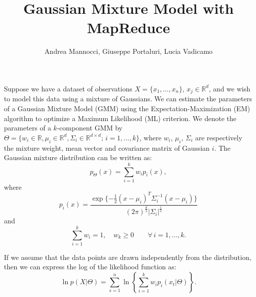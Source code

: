 \documentclass[a4paper,10pt]{article}
\title{Gaussian Mixture Model with MapReduce}%
\author{Andrea Mannocci, Giuseppe Portaluri, Lucia Vadicamo}
\date{}
\begin{document}
\maketitle
Suppose we have a dataset of observations $X=\{x_1, \dots, x_n\}$, $x_j\in \mathbb{R}^d$, and we wish to model this data using a mixture of Gaussians. We can estimate the parameters of a Gaussian Mixture Model (GMM) using the Expectation-Maximization (EM) algorithm \cite{bishop06} to optimize a Maximum Likelihood (ML) criterion.
We denote the parameters of a $k$-component GMM by $\Theta=\{w_i \in \mathbb{R}, \mu_{i}\in\mathbb{R}^d, \Sigma_i \in \mathbb{R}^{d\times d};\, i=1,\dots, k\}$, where $w_{i}$, $\mu_i$, $\Sigma_i$ are respectively the mixture weight, mean vector and covariance matrix of Gaussian $i$.
The Gaussian mixture distribution can be written as:
\begin{equation}
p_\Theta(x)=\sum_{i=1}^k w_i p_i(x),
\end{equation}
where
\begin{equation}
p_i(x)=\dfrac{\exp\{-\frac{1}{2}(x-\mu_i )^T\Sigma_i^{-1}(x-\mu_i )\}}{(2\pi)^{\frac{d}{2}} |\Sigma_i|^\frac{1}{2}}
\end{equation}
and 
\begin{equation}
\label{eq:constrain}
\sum_{i=1}^k w_i=1, \quad w_k\geq 0 \qquad \forall\,  i=1, \dots, k.
\end{equation}


If we assume that the data points are drawn independently from the distribution, then we can express the log of the likelihood function as:
\begin{equation}
\ln p(X| \Theta)=\sum_{s=1}^ n \ln \left\{ \sum_{i=1}^k w_i p_i(x_t|\Theta)\right\}.
\end{equation} 

\end{document}
